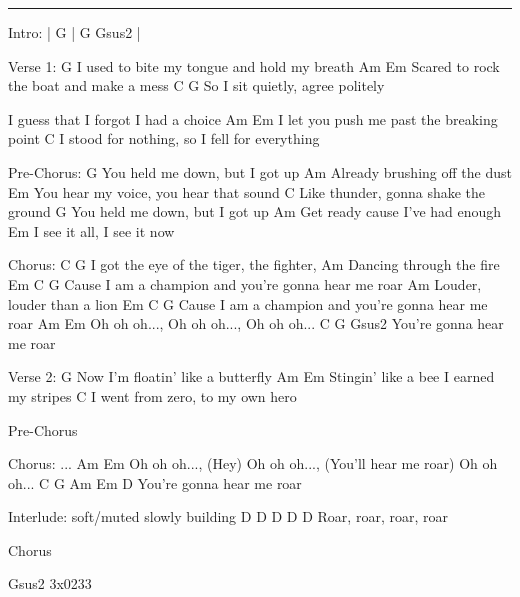 \noindent\rule{\columnwidth}{1pt}

\begin{lstsong}
Intro: | G    | G   Gsus2 |

Verse 1:
G
 I used to bite my tongue and hold my breath
                        Am             Em
Scared to rock the boat and make a mess
                          C       G
So I sit quietly, agree politely
 
I guess that I forgot I had a choice
                   Am                     Em
I let you push me past the breaking point
                                   C
I stood for nothing, so I fell for everything
 
Pre-Chorus:
    G
You held me down, but I got up
                 Am
Already brushing off the dust
    Em
You hear my voice, you hear that sound
                    C
Like thunder, gonna shake the ground
    G
You held me down, but I got up
                     Am
Get ready cause I've had enough
  Em
I see it all, I see it now
 
Chorus:
          C           G
I got the eye of the tiger, the fighter,
                     Am
Dancing through the fire
      Em                                C       G
Cause I am a champion and you're gonna hear me roar
                       Am
Louder, louder than a lion
      Em                                C       G
Cause I am a champion and you're gonna hear me roar
                    Am   Em
Oh oh oh..., Oh oh oh..., Oh oh oh...
              C       G   Gsus2
You're gonna hear me roar
 
Verse 2:
G
 Now I'm floatin' like a butterfly
                      Am               Em
Stingin' like a bee I earned my stripes
                             C
I went from zero, to my own hero
 
Pre-Chorus
 
 
Chorus:
...
                          Am                    Em
Oh oh oh..., (Hey) Oh oh oh..., (You'll hear me roar) Oh oh oh...
              C       G      Am  Em    D
You're gonna hear me roar
 
Interlude: soft/muted slowly building
    D              D D D D
Roar, roar, roar, roar

Chorus

Gsus2 3x0233
\end{lstsong}
\newpage



